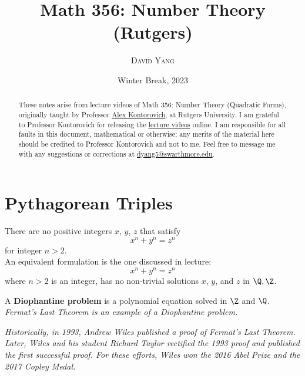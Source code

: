 \documentclass[11pt]{article}
\begin{document}
\title{\LARGE \textbf{Math 356: Number Theory (Rutgers)}}
\date{Winter Break, 2023}
\author{\textsc{David Yang}}

\maketitle

\begin{abstract}
These notes arise from lecture videos of Math 356: Number Theory (Quadratic Forms), originally taught by 
Professor \href{https://sites.math.rutgers.edu/~alexk/}{Alex Kontorovich}, at Rutgers University. I am grateful
to Professor Kontorovich for releasing the \href{https://www.youtube.com/playlist?list=PLs6rMe3K87LEwc77iVba5AsAUPC1qVowy}{lecture videos} online. 
I am responsible for all faults in this document, mathematical or otherwise; any merits of the
material here should be credited to Professor Kontorovich and not to me.
Feel free to message me with any suggestions or corrections at \href{mailto:dyang5@swarthmore.edu}{dyang5@swarthmore.edu}.
\end{abstract}

\tableofcontents

\newpage

\section{Pythagorean Triples}

\begin{theorem}
There are no positive integers $x$, $y$, $z$ that satisfy \[x^n + y^n = z^n\]
for integer $n > 2$. \\

An equivalent formulation is the one discussed in lecture:
\[
    x^n + y^n = z^n
\] where $n > 2$ is an integer, has no non-trivial solutions $x$, $y$, and $z$ in $\Q, \Z$.
\end{theorem}

\begin{definition}
A \textbf{Diophantine problem} is a polynomial equation solved in $\Z$ and $\Q$. \\

\textit{Fermat's Last Theorem is an example of a Diophantine problem.}
\end{definition}

\textit{Historically, in 1993, Andrew Wiles published a proof of Fermat's Last Theorem. Later, Wiles and his student Richard Taylor rectified the 1993 proof and published
the first successful proof. For these efforts, Wiles won the 2016 Abel Prize and
the 2017 Copley Medal.} \\
\end{document}
